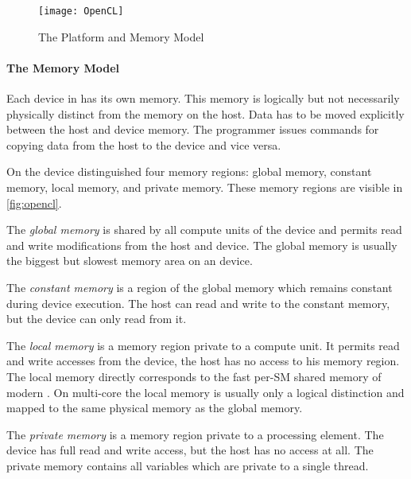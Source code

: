 \begin{figure}
  \centering
  \texttt{[image: OpenCL]}
  \caption{The \OpenCL Platform and Memory Model}
  \label{fig:opencl}
\end{figure}

\paragraph{The \OpenCL Memory Model}
Each device in \OpenCL has its own memory.
This memory is logically but not necessarily physically distinct from the memory on the host.
Data has to be moved explicitly between the host and device memory.
The programmer issues commands for copying data from the host to the device and vice versa.

On the device \OpenCL distinguished four memory regions:
global memory, constant memory, local memory, and private memory.
These memory regions are visible in \autoref{fig:opencl}.

The \emph{global memory} is shared by all compute units of the device and permits read and write modifications from the host and device.
The global memory is usually the biggest but slowest memory area on an \OpenCL device.

The \emph{constant memory} is a region of the global memory which remains constant during device execution.
The host can read and write to the constant memory, but the device can only read from it.

The \emph{local memory} is a memory region private to a compute unit.
It permits read and write accesses from the device, the host has no access to his memory region.
The local memory directly corresponds to the fast per-SM shared memory of modern \GPUs.
On multi-core \CPUs the local memory is usually only a logical distinction and mapped to the same physical memory as the global memory.

The \emph{private memory} is a memory region private to a processing element.
The device has full read and write access, but the host has no access at all.
The private memory contains all variables which are private to a single thread.


